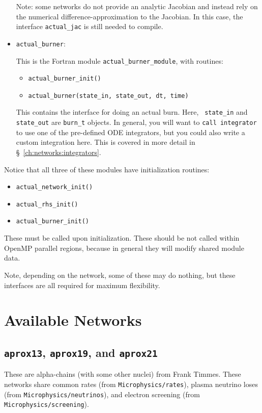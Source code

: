 \begin{itemize}
  Note: some networks do not provide an analytic Jacobian and instead
  rely on the numerical difference-approximation to the Jacobian.  In
  this case, the interface {\tt actual\_jac} is still needed to compile.

\item {\tt actual\_burner}:

  This is the Fortran module {\tt actual\_burner\_module}, with routines:
  \begin{itemize}
  \item {\tt actual\_burner\_init()}
  \item {\tt actual\_burner(state\_in, state\_out, dt, time)}
  \end{itemize}

  This contains the interface for doing an actual burn.  Here, {\tt
    state\_in} and {\tt state\_out} are {\tt burn\_t} objects.  In
  general, you will want to {\tt call integrator} to use one of the
  pre-defined ODE integrators, but you could also write a custom
  integration here. This is covered in more detail in \S~\ref{ch:networks:integrators}.

\end{itemize}

Notice that all three of these modules have initialization routines:
\begin{itemize}
  \item {\tt actual\_network\_init()}
  \item {\tt actual\_rhs\_init()}
  \item {\tt actual\_burner\_init()}
\end{itemize}
These must be called upon initialization. These should be not called
within OpenMP parallel regions, because in general they will modify
shared module data.

Note, depending on the network, some of these may do nothing, but
these interfaces are all required for maximum flexibility.


\section{Available Networks}


\subsection{{\tt aprox13}, {\tt aprox19}, and {\tt aprox21}}

These are alpha-chains (with some other nuclei) from Frank Timmes.
These networks share common rates (from {\tt Microphysics/rates}),
plasma neutrino loses (from {\tt Microphysics/neutrinos}), and
electron screening (from {\tt Microphysics/screening}).

